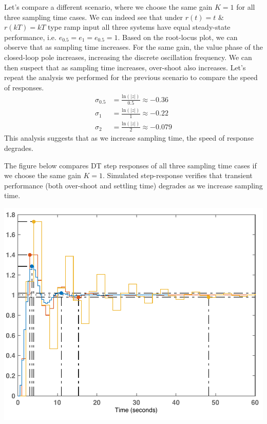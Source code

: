 \documentclass[twoside]{article}
\begin{document}
Let's compare a different scenario, where we choose the same gain $K = 1$ for all three sampling time cases. We can indeed see that under $r(t) = t$ \& $r(kT) = kT$ type ramp input all three systems have equal steady-state performance, i.e. $e_{0.5} = e_{1} = e_{0.5} = 1$. Based on the root-locus plot, we can observe that as sampling time increases. For the same gain, the value phase of the closed-loop pole increases, increasing the discrete oscillation frequency. We can then suspect that as sampling time increases, over-shoot also increases. Let's repeat the analysis we performed for the previous scenario to compare the speed of responses.
%
\begin{align*}
\sigma_{0.5} &= \frac{\mathrm{ln}(|z|) }{0.5} \approx -0.36
\\
\sigma_{1} &= \frac{\mathrm{ln}(|z|) }{1} \approx -0.22
\\
\sigma_{2} &= \frac{\mathrm{ln}(|z|) }{2} \approx -0.079
\end{align*}
%
This analysis suggests that as we increase sampling time, the speed of response degrades. 

The figure below compares DT step responses of all three sampling time cases if we choose the same gain $K = 1$. Simulated step-response verifies that transient performance (both over-shoot and settling time) degrades as we increase sampling time.

\begin{center}
\begin{minipage}[h]{\linewidth}
    \begin{center}
      \includegraphics[width=\textwidth]{stepUnderDamoed}
    \end{center}
\end{minipage}
\end{center}
\end{document}
